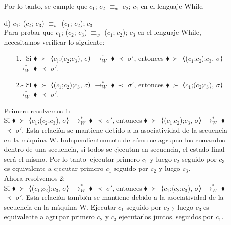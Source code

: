 \documentclass{article}
\begin{document}
\begin{itemize}
\begin{itemize}
            Por lo tanto, se cumple que $c_1$; $c_2$ $\equiv_w$ $c_2$; $c_1$ en el lenguaje While.\\
            
            \item[d)] $c_1$; ($c_2$; $c_3$) $\equiv_w$ ($c_1$; $c_2$); $c_3$ \\

            Para probar que $c_1$; ($c_2$; $c_3$) $\equiv_w$ ($c_1$; $c_2$); $c_3$ en el lenguaje While, necesitamos verificar lo siguiente:\\

            \begin{itemize}
                \item[1.-] Si $\blacklozenge$ $\succ$  ⟨$c_1$;($c_2$;$c_3$), $\sigma$⟩ $\longrightarrow^{*}_{W}$ $\blacklozenge$ $\prec$ $\sigma'$, entonces $\blacklozenge$ $\succ$  ⟨($c_1$;$c_2$);$c_3$, $\sigma$⟩ $\longrightarrow^{*}_{W}$ $\blacklozenge$ $\prec$ $\sigma'$.

                \item[2.-] Si $\blacklozenge$ $\succ$  ⟨($c_1$;$c_2$);$c_3$, $\sigma$⟩ $\longrightarrow^{*}_{W}$ $\blacklozenge$ $\prec$ $\sigma'$, entonces $\blacklozenge$ $\succ$  ⟨$c_1$;($c_2$;$c_3$), $\sigma$⟩ $\longrightarrow^{*}_{W}$ $\blacklozenge$ $\prec$ $\sigma'$.\\
            \end{itemize}

            Primero resolvemos 1:\\

            Si $\blacklozenge$ $\succ$  ⟨$c_1$;($c_2$;$c_3$), $\sigma$⟩ $\longrightarrow^{*}_{W}$ $\blacklozenge$ $\prec$ $\sigma'$, entonces $\blacklozenge$ $\succ$  ⟨($c_1$;$c_2$);$c_3$, $\sigma$⟩ $\longrightarrow^{*}_{W}$ $\blacklozenge$ $\prec$ $\sigma'$. Esta relación se mantiene debido a la asociatividad de la secuencia en la máquina W. Independientemente de cómo se agrupen los comandos dentro de una secuencia, si todos se ejecutan en secuencia, el estado final será el mismo. Por lo tanto, ejecutar primero $c_1$ y luego $c_2$ seguido por $c_3$ es equivalente a ejecutar primero $c_1$ seguido por $c_2$ y luego $c_3$.\\

            Ahora resolvemos 2:\\

            Si $\blacklozenge$ $\succ$  ⟨($c_1$;$c_2$);$c_3$, $\sigma$⟩ $\longrightarrow^{*}_{W}$ $\blacklozenge$ $\prec$ $\sigma'$, entonces $\blacklozenge$ $\succ$  ⟨$c_1$;($c_2$;$c_3$), $\sigma$⟩ $\longrightarrow^{*}_{W}$ $\blacklozenge$ $\prec$ $\sigma'$. Esta relación también se mantiene debido a la asociatividad de la secuencia en la máquina W. Ejecutar $c_1$ seguido por $c_2$ y luego $c_3$ es equivalente a agrupar primero $c_2$ y $c_3$ ejecutarlos juntos, seguidos por $c_1$.\\
            

\end{itemize}
\end{itemize}
\end{document}
